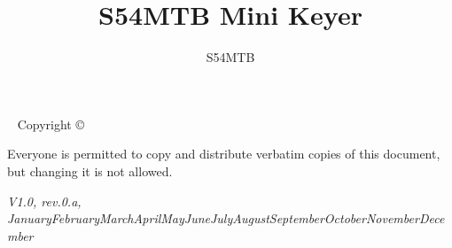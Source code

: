 \documentclass{tufte-book} %
\title{S54MTB Mini Keyer} %
\author{S54MTB} %
\newcommand{\monthyear}{\ifcase\month\or January\or February\or March\or April\or May\or June\or July\or August\or September\or October\or November\or December\fi\space\number\year} %
\newcommand{\openepigraph}[2]{ %
\begin{fullwidth}
\sffamily\large
\begin{doublespace}
\noindent\allcaps{#1}\\ %
\noindent\allcaps{#2} %
\end{doublespace}
\end{fullwidth}
}
\begin{document}
\frontmatter



\maketitle %


\newpage
\begin{fullwidth}
~\vfill
\thispagestyle{empty}
\setlength{\parindent}{0pt}
\setlength{\parskip}{\baselineskip}
Copyright \copyright\ \the\year\ \thanklessauthor

\par{}

\par{}

\par Everyone is permitted to copy and distribute verbatim copies of this document, but changing it is not allowed.

\par\textit{V1.0, rev.0.a, \monthyear}
\end{fullwidth}


\tableofcontents %

%
%
%
%
%
\end{document}
